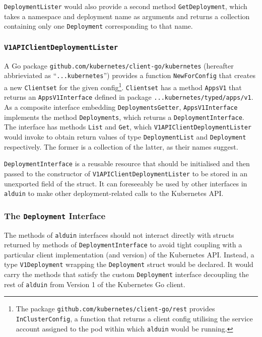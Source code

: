 \documentclass{article}
\begin{document}
\texttt{DeploymentLister} would also provide a second method
\texttt{GetDeployment},
which takes a namespace and deployment name as arguments and
returns a collection containing only one \texttt{Deployment}
corresponding to that name.

\subsubsection{\texttt{V1APIClientDeploymentLister}}
A Go package \texttt{github.com/kubernetes/client-go/kubernetes}
(hereafter abbrieviated as ``\texttt{...kubernetes}'')
provides a function \texttt{NewForConfig}
that creates a new \texttt{Clientset} for the given config\footnote{
    The package \texttt{github.com/kubernetes/client-go/rest}
    provides \texttt{InClusterConfig},
    a function that returns a client config utilising the service account
    assigned to the pod within which \texttt{alduin} would be running.
}.
\texttt{Clientset} has a method \texttt{AppsV1}
that returns an \texttt{AppsV1Interface}
defined in package \texttt{...kubernetes/typed/apps/v1}.
As a composite interface embedding \texttt{DeploymentsGetter},
\texttt{AppsV1Interface} implements the method \texttt{Deployments},
which returns a \texttt{DeploymentInterface}.
The interface has methods \texttt{List} and \texttt{Get},
which \texttt{V1APIClientDeploymentLister} would invoke to obtain return values
of type \texttt{DeploymentList} and \texttt{Deployment} respectively.
The former is a collection of the latter,
as their names suggest.

\texttt{DeploymentInterface} is a reusable resource
that should be initialised and then passed to
the constructor of \texttt{V1APIClientDeploymentLister}
to be stored in an unexported field of the struct.
It can foreseeably be used by other interfaces in \texttt{alduin}
to make other deployment-related calls to the Kubernetes API.

\subsubsection{The \texttt{Deployment} Interface}
The methods of \texttt{alduin} interfaces should not interact directly
with structs returned by methods of \texttt{DeploymentInterface}
to avoid tight coupling with a particular client implementation (and version)
of the Kubernetes API.
Instead, a type \texttt{V1Deployment} wrapping the \texttt{Deployment} struct
would be declared.
It would carry the methods that satisfy the custom \texttt{Deployment} interface
decoupling the rest of \texttt{alduin} from Version 1
of the Kubernetes Go client.
\end{document}
